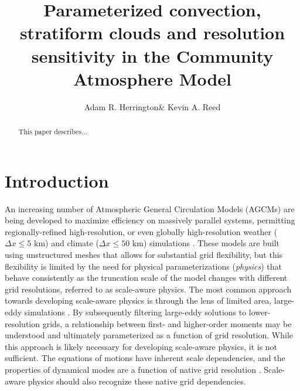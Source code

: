 \documentclass[times]{qjrms4}
\begin{document}

\title{Parameterized convection, stratiform clouds and resolution sensitivity in the Community Atmosphere Model}

\author{Adam R. Herrington\corrauth \& Kevin A. Reed}
\address{School of Marine and Atmospheric Sciences, Stony Brook University, Stony Brook, NY 11794}


\begin{abstract}
This paper describes...
\end{abstract}


\maketitle

\section{Introduction}

An increasing number of Atmospheric General Circulation Models (AGCMs) are being developed to maximize efficiency on massively parallel systems, permitting regionally-refined high-resolution, or even globally high-resolution weather ($\Delta x \leq 5$ km) and climate ($\Delta x \leq 50$ km) simulations \citep{SMTMN2008JCP,MPASatm,Z2014QJRMS,HETAL2016JCLIM,DCMIP16,LetAl2018JAMES}. These models are built using unstructured meshes that allows for substantial grid flexibility, but this flexibility is limited by the need for physical parameterizations ({\em{physics}}) that behave consistently as the truncation scale of the model changes with different grid resolutions, referred to as scale-aware physics. The most common approach towards developing scale-aware physics is through the lens of limited area, large-eddy simulations \citep[e.g.,][]{PC2008JAS,AW2013JAS,SZ2018JCLIM}. By subsequently filtering large-eddy solutions to lower-resolution grids, a relationship between first- and higher-order moments may be understood and ultimately parameterized as a function of grid resolution. While this approach is likely necessary for developing scale-aware physics, it is not sufficient. The equations of motions have inherent scale dependencies, and the properties of dynamical modes are a function of native grid resolution \citep{O1981JAS,WETAL1997MWR,PG2006JAS,JR2016QJRMS}. Scale-aware physics should also recognize these native grid dependencies.
\end{document}
